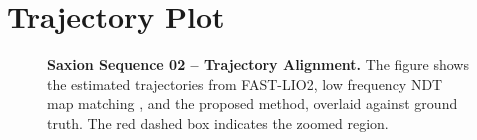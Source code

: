 \chapter{Trajectory Plot}
\label{appx:simulation}

\begin{figure}[H]
	\centering
	\caption[Saxion Sequence 02– Trajectory Alignment with Zoomed Comparison]%
	{\textbf{Saxion Sequence 02 – Trajectory Alignment.} 
		The figure shows the estimated trajectories from FAST-LIO2, low frequency NDT map matching , and the proposed method, overlaid against ground truth. The red dashed box indicates the zoomed region.
	}
	\label{fig:saxion-seq2-trajectory-zoom}
	
	
\end{figure}

